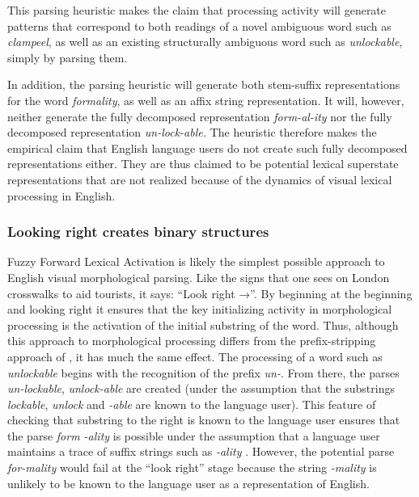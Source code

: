 \documentclass[output=paper]{langsci/langscibook}
\begin{document}
This parsing heuristic makes the claim that processing activity will generate patterns that correspond to both readings of a novel ambiguous word such as \textit{clampeel}, as well as an existing structurally ambiguous word such as \textit{unlockable}, simply by parsing them.

In addition, the parsing heuristic will generate both stem-suffix representations for the word \textit{formality}, as well as an affix string representation. It will, however, neither generate the fully decomposed representation \textit{form-al-ity} nor the fully decomposed representation \textit{un-lock-able.} The heuristic therefore makes the empirical claim that English language users do not create such fully decomposed representations either.  They are thus claimed to be potential lexical superstate representations that are not realized because of the dynamics of visual lexical processing in English. 

\subsubsection{Looking right creates binary structures}\label{sec:libben:1.4.1}

Fuzzy Forward Lexical Activation is likely the simplest possible approach to English visual morphological parsing. Like the signs that one sees on London crosswalks to aid tourists, it says: “Look right →”.  By beginning at the beginning and looking right it ensures that the key initializing activity in morphological processing is the activation of the initial substring of the word. Thus, although this approach to morphological processing differs from the prefix-stripping approach of \citet{TaftForster1975}, it has much the same effect.  The processing of a word such as \textit{unlockable} begins with the recognition of the prefix \textit{un-}. 
From there, the parses \textit{un-lockable}, \textit{unlock-able} are created (under the assumption that the substrings \textit{lockable}, \textit{unlock} and \textit{-able} are known to the language user). This feature of checking that substring to the right is known to the language user ensures that the parse \textit{form -ality} is possible under the assumption that a language user maintains a trace of suffix strings such as \textit{-ality} \citep{Derwing2014,LibbenEtAl2015}.  However, the potential parse \textit{for-mality} would fail at the “look right” stage because the string \textit{-mality} is unlikely to be known to the language user as a representation of English.
\end{document}
